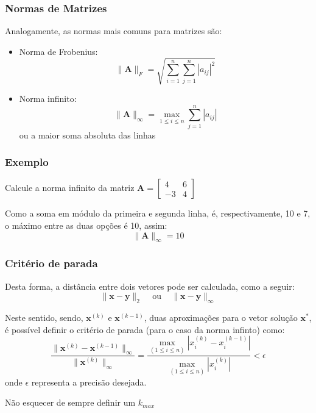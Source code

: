 \documentclass{beamer}
\theoremstyle{mystyle}
\begin{document}
\begin{frame}
	\frametitle{Normas de Matrizes}
	Analogamente, as normas mais comuns para matrizes são:
	\begin{itemize}
		\item Norma de Frobenius:
		\begin{equation*}
			\| \mathbf{A} \|_{F} = \sqrt{\sum_{i=1}^{n}\sum_{j=1}^{n} |a_{ij}|^{2}}
		\end{equation*}
		\item Norma infinito:
		\begin{equation*}
			\| \mathbf{A} \|_{\infty} = \max_{1\leq i \leq n} \sum_{j=1}^{n} |a_{ij}|
		\end{equation*}
		ou a maior soma absoluta das linhas
	\end{itemize}
\end{frame}

\begin{frame}
	\frametitle{Exemplo}
	Calcule a norma infinito da matriz $ \mathbf{A} = \left[
	\begin{array}{cc}
		4 & 6 \\
		-3 & 4 
	\end{array}
	\right]  $
	\pause
	
	Como a soma em módulo da primeira e segunda linha, é, respectivamente, 10 e 7, o máximo entre as duas opções é 10, assim:
	\begin{equation*}
		\| \mathbf{A} \|_{\infty} = 10
	\end{equation*}
\end{frame}

\begin{frame}
	\frametitle{Critério de parada}
	Desta forma, a distância entre dois vetores pode ser calculada, como a seguir:
	\begin{equation*}
		\| \mathbf{x} - \mathbf{y} \|_{2} \;\;\; \mbox{ ou } \;\;\; 	\| \mathbf{x} - \mathbf{y} \|_{\infty} 
	\end{equation*}
	
	Neste sentido, sendo, $ \mathbf{x}^{(k)} $ e $ \mathbf{x}^{(k-1)} $, duas aproximações para o vetor solução $ \mathbf{x}^{*} $, é possível definir o critério de parada (para o caso da norma infinto) como:
	\begin{equation*}
		\dfrac{\| \mathbf{x}^{(k)} - \mathbf{x}^{(k-1)}\|_{\infty}}{\| \mathbf{x}^{(k)} \|_{\infty} }	= \dfrac{\max_{(1\leq i \leq n)}| x_{i}^{(k)} - x_{i}^{(k-1)}|}{\max_{(1\leq i \leq n)}| x_{i}^{(k)} | } < \epsilon	
	\end{equation*}
	onde $ \epsilon $ representa a precisão desejada.
	\pause
	
	\alert{Não esquecer de sempre definir um $ k_{max} $}
\end{frame}
\end{document}
